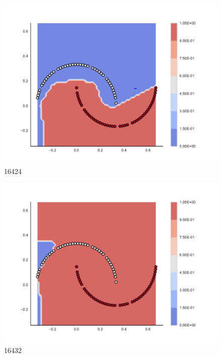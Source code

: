 \begin{subfigure}[b]{0.12\textwidth}
    \includegraphics[clip, trim=2.35cm 1.75cm 4.5cm 0cm,width=\textwidth]{img/convergence/16424.pdf}
    \caption{16424}
    \label{fig:convergence_16424}
\end{subfigure}
%
\begin{subfigure}[b]{0.12\textwidth}
    \includegraphics[clip, trim=2.35cm 1.75cm 4.5cm 0cm,width=\textwidth]{img/convergence/16432.pdf}
    \caption{16432}
    \label{fig:convergence_16432}
\end{subfigure}
%
